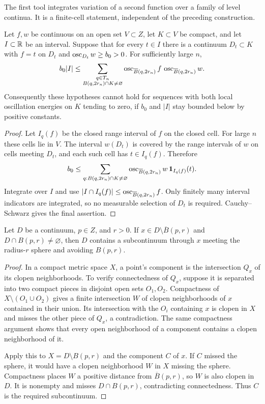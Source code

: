 The first tool integrates variation of a second function over a
family of level continua. It is a finite-cell statement, independent
of the preceding construction.

\begin{lemma}
\label{lem:cross-energy}
Let $f,w$ be continuous on an open set $V\subset Z$, let $K\subset V$
be compact, and let $I\subset\mathbb R$ be an interval. Suppose that for
every $t\in I$ there is a continuum $D_t\subset K$ with $f=t$ on
$D_t$ and $\operatorname{osc}_{D_t}w\geq b_0>0$. For sufficiently large $n$,
\begin{equation}
 b_0|I|\leq
 \sum_{\substack{q\in T_n\\B(q,2r_n)\cap K\ne\varnothing}}
 \operatorname{osc}_{\overline B(q,2r_n)}f\,
 \operatorname{osc}_{\overline B(q,2r_n)}w.
 \label{eq:cross-energy}
\end{equation}
Consequently these hypotheses cannot hold for sequences with both
local oscillation energies on $K$ tending to zero, if $b_0$ and
$|I|$ stay bounded below by positive constants.
\end{lemma}
\begin{proof}
Let $I_q(f)$ be the closed range interval of $f$ on the closed cell.
For large $n$ these cells lie in $V$. The interval $w(D_t)$ is covered
by the range intervals of $w$ on cells meeting $D_t$, and each such
cell has $t\in I_q(f)$. Therefore
\[
 b_0\leq\sum_{q:B(q,2r_n)\cap K\ne\varnothing}
 \operatorname{osc}_{\overline B(q,2r_n)}w\,\mathbf1_{I_q(f)}(t).
\]
Integrate over $I$ and use
$|I\cap I_q(f)|\leq\operatorname{osc}_{\overline B(q,2r_n)}f$.
Only finitely many interval indicators are integrated, so no
measurable selection of $D_t$ is required. Cauchy--Schwarz gives
the final assertion.
\end{proof}

\begin{lemma}
\label{lem:stop-continuum}
Let $D$ be a continuum, $p\in Z$, and $r>0$. If
$x\in D\setminus\overline B(p,r)$ and $D\cap B(p,r)\ne\varnothing$,
then $D$ contains a subcontinuum through $x$ meeting the radius-$r$
sphere and avoiding $B(p,r)$.
\end{lemma}
\begin{proof}
In a compact metric space $X$, a point's component is the intersection
$Q_x$ of its clopen neighborhoods. To verify connectedness of $Q_x$,
suppose it is separated into two compact pieces in disjoint open sets
$O_1,O_2$. Compactness of $X\setminus(O_1\cup O_2)$ gives a finite
intersection $W$ of clopen neighborhoods of $x$ contained in their
union. Its intersection with the $O_i$ containing $x$ is clopen in
$X$ and misses the other piece of $Q_x$, a contradiction. The same
compactness argument shows that every open neighborhood of a component
contains a clopen neighborhood of it.

Apply this to $X=D\setminus B(p,r)$ and the component $C$ of $x$.
If $C$ missed the sphere, it would have a clopen neighborhood $W$ in
$X$ missing the sphere. Compactness places $W$ a positive distance
from $\overline B(p,r)$, so $W$ is also clopen in $D$. It is nonempty
and misses $D\cap B(p,r)$, contradicting connectedness. Thus $C$ is
the required subcontinuum.
\end{proof}
